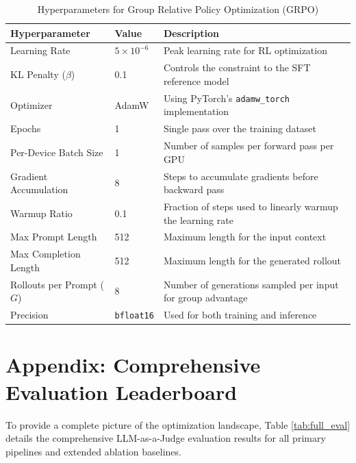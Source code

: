 \documentclass{article}
\theoremstyle{plain}
\theoremstyle{definition}
\theoremstyle{remark}
\begin{document}
\begin{table}[h]
\centering
\caption{Hyperparameters for Group Relative Policy Optimization (GRPO)}
\begin{tabular}{lll}
\toprule
\textbf{Hyperparameter} & \textbf{Value} & \textbf{Description} \\
\midrule
Learning Rate & $5 \times 10^{-6}$ & Peak learning rate for RL optimization \\
KL Penalty ($\beta$) & 0.1 & Controls the constraint to the SFT reference model \\
Optimizer & AdamW & Using PyTorch's \texttt{adamw\_torch} implementation \\
Epochs & 1 & Single pass over the training dataset \\
Per-Device Batch Size & 1 & Number of samples per forward pass per GPU \\
Gradient Accumulation & 8 & Steps to accumulate gradients before backward pass \\
Warmup Ratio & 0.1 & Fraction of steps used to linearly warmup the learning rate \\
Max Prompt Length & 512 & Maximum length for the input context \\
Max Completion Length & 512 & Maximum length for the generated rollout \\
Rollouts per Prompt ($G$) & 8 & Number of generations sampled per input for group advantage \\
Precision & \texttt{bfloat16} & Used for both training and inference \\
\bottomrule
\end{tabular}
\label{tab:grpo_hyperparams}
\end{table}

\section{Appendix: Comprehensive Evaluation Leaderboard}
\label{sec:appendix_full_eval}
To provide a complete picture of the optimization landscape, Table \ref{tab:full_eval} details the comprehensive LLM-as-a-Judge evaluation results for all primary pipelines and extended ablation baselines.
\end{document}
